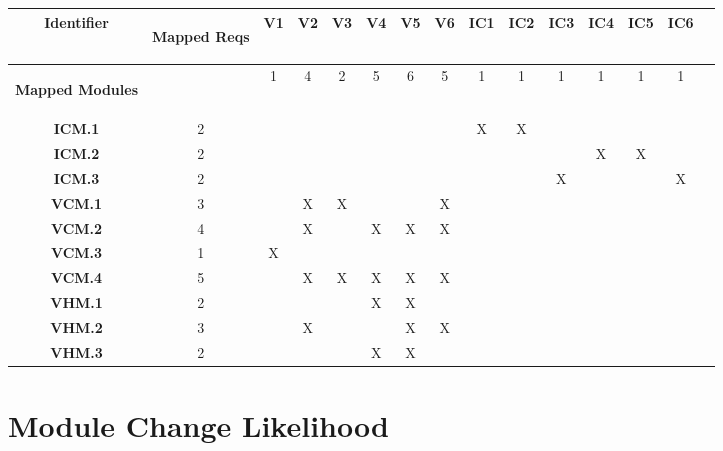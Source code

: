 \documentclass [10pt]{article}
\begin{document}
\begin{center}

\begin{tabular}{|c|c|c|c|c|c|c|c|c|c|c|c|c|c|c|} \hline
   \textbf{Identifier } & 
  \begin{minipage} {.09\columnwidth}  \begin {center}\textbf{ Mapped Reqs}\vspace{1mm}\end{center}\end{minipage} 
 & \textbf{V1} &\textbf{V2} &\textbf{V3} &\textbf{V4} &\textbf{V5} &\textbf{V6} &\textbf{IC1}  &\textbf{IC2} &\textbf{IC3} &\textbf{IC4}&\textbf{IC5}  &\textbf{IC6}  \\ \hline
 \begin{minipage} {.1\columnwidth}\vspace{1mm}  \begin {center}\textbf{ Mapped Modules}\vspace{1mm}\end{center}\end{minipage} & & 1& 4& 2& 5& 6& 5&1 &1 &1&1 &1 &1  \\ \hline
\textbf{ICM.1} & 2& & & & & & & X & X & & & & \\ \hline
\textbf{ICM.2} & 2& & & & & & & & & &X & X& \\ \hline
\textbf{ICM.3} & 2& & & & & & & & & X& & & X \\ \hline
\textbf{VCM.1} & 3& &X &X & & &X & & & & & & \\ \hline
\textbf{VCM.2} & 4& &X & & X& X&X & & & & & & \\ \hline
\textbf{VCM.3} & 1&X & & & & & & & & & & & \\ \hline
\textbf{VCM.4} & 5& &X & X& X& X&X & & & & & & \\ \hline
\textbf{VHM.1} & 2& & & & X& X & & & & & & & \\ \hline
\textbf{VHM.2} & 3 & & X& & & X&X & & & & & & \\ \hline
\textbf{VHM.3} & 2& & & &X & X& & & & & & & \\ \hline
\end{tabular}
\end{center}
\section{Module Change Likelihood}
\end{document}
